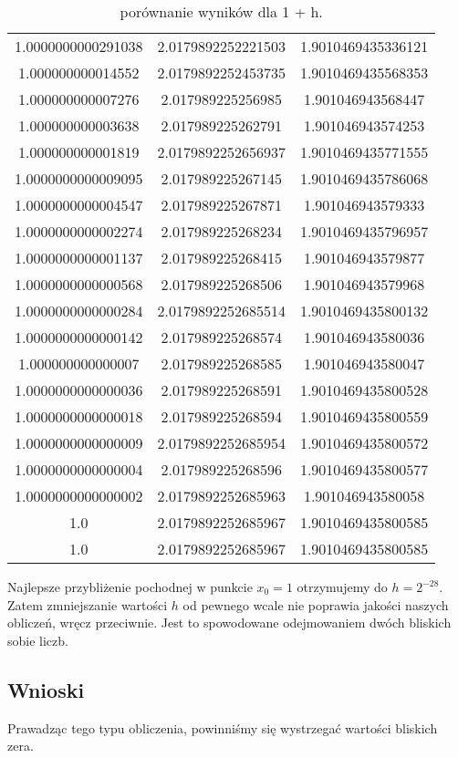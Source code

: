 \documentclass{article}
\begin{document}
\begin{center}
\begin{table}[h!]
\begin{tabular}{||c c c||}
     1.0000000000291038 & 2.0179892252221503 & 1.9010469435336121 \\ 
     1.000000000014552 & 2.0179892252453735 & 1.9010469435568353 \\ 
     1.000000000007276 & 2.017989225256985 & 1.901046943568447 \\ 
     1.000000000003638 & 2.017989225262791 & 1.901046943574253 \\ 
     1.000000000001819 & 2.0179892252656937 & 1.9010469435771555 \\ 
     1.0000000000009095 & 2.017989225267145 & 1.9010469435786068 \\ 
     1.0000000000004547 & 2.017989225267871 & 1.901046943579333 \\ 
     1.0000000000002274 & 2.017989225268234 & 1.9010469435796957 \\ 
     1.0000000000001137 & 2.017989225268415 & 1.901046943579877 \\ 
     1.0000000000000568 & 2.017989225268506 & 1.901046943579968 \\ 
     1.0000000000000284 & 2.0179892252685514 & 1.9010469435800132 \\ 
     1.0000000000000142 & 2.017989225268574 & 1.901046943580036\\ 
     1.000000000000007 & 2.017989225268585 & 1.901046943580047 \\ 
     1.0000000000000036 & 2.017989225268591 & 1.9010469435800528 \\ 
     1.0000000000000018 & 2.017989225268594 & 1.9010469435800559 \\ 
     1.0000000000000009 & 2.0179892252685954 & 1.9010469435800572 \\ 
     1.0000000000000004 & 2.017989225268596 & 1.9010469435800577 \\ 
     1.0000000000000002 & 2.0179892252685963 & 1.901046943580058 \\ 
     1.0 & 2.0179892252685967 & 1.9010469435800585 \\ 
     1.0 & 2.0179892252685967 & 1.9010469435800585 \\ 
     \hline
     \end{tabular}
     \caption{porównanie wyników dla 1 + h.}
     \label{table:14}
     \end{table}

    \large Najlepsze przybliżenie pochodnej w punkcie \(x_{0} = 1\) otrzymujemy do \(h = 2^{-28}\).
     Zatem zmniejszanie wartości \(h\) od pewnego wcale nie poprawia jakości naszych obliczeń, wręcz przeciwnie.
     Jest to spowodowane odejmowaniem dwóch bliskich sobie liczb.
    \subsection{Wnioski}
    \large Prawadząc tego typu obliczenia, powinniśmy się wystrzegać wartości bliskich zera.


    \end{center}
\end{document}
